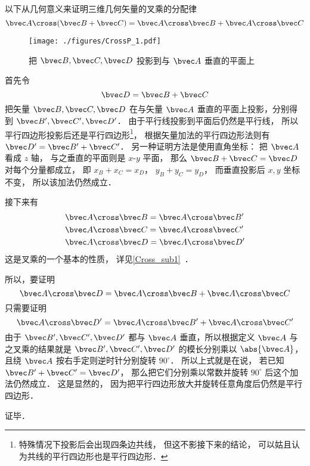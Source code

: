 
以下从几何意义来证明三维几何矢量的叉乘的分配律
\begin{equation}
\bvec A \cross (\bvec B + \bvec C) = \bvec A \cross \bvec B + \bvec A \cross \bvec C
\end{equation}

\begin{figure}[ht]
\vskip-10pt
\centering
\texttt{[image: ./figures/CrossP\_1.pdf]}
\caption{把 $\bvec B,\bvec C,\bvec D$ 投影到与 $\bvec A$ 垂直的平面上}
\end{figure}

首先令
\begin{equation}
\bvec D = \bvec B + \bvec C
\end{equation}
把矢量 $\bvec B,\bvec C,\bvec D$ 在与矢量 $\bvec A$ 垂直的平面上投影，分别得到 $\bvec B',\bvec C',\bvec D'$． 由于平行线投影到平面后仍然是平行线， 所以平行四边形投影后还是平行四边形\footnote{特殊情况下投影后会出现四条边共线， 但这不影接下来的结论， 可以姑且认为共线的平行四边形也是平行四边形．}， 根据矢量加法的平行四边形法则有 $\bvec D'=\bvec B'+\bvec C'$． 另一种证明方法是使用直角坐标： 把 $\bvec A$ 看成 $z$ 轴， 与之垂直的平面则是 $x$-$y$ 平面， 那么 $\bvec B + \bvec C = \bvec D$ 对每个分量都成立， 即 $x_B + x_C = x_D$， $y_B + y_C = y_D$， 而垂直投影后 $x,y$ 坐标不变， 所以该加法仍然成立．

接下来有
\begin{equation}
\begin{aligned}
&\bvec A \cross \bvec B = \bvec A \cross \bvec B'\\
&\bvec A \cross \bvec C = \bvec A \cross \bvec C'\\
&\bvec A \cross \bvec D = \bvec A \cross \bvec D'
\end{aligned}
\end{equation} 
这是叉乘的一个基本的性质， 详见\autoref{Cross_sub1}~．

所以，要证明
\begin{equation}
\bvec A \cross \bvec D = \bvec A \cross \bvec B + \bvec A \cross \bvec C
\end{equation}
只需要证明
\begin{equation}
\bvec A \cross \bvec D' = \bvec A \cross \bvec B' + \bvec A \cross \bvec C'
\end{equation}
由于 $\bvec B', \bvec C', \bvec D'$ 都与 $\bvec A$ 垂直，所以根据定义 $\bvec A$ 与之叉乘的结果就是 $\bvec B', \bvec C', \bvec D'$ 的模长分别乘以 $\abs {\bvec A}$， 且绕 $\bvec A$ 按右手定则逆时针分别旋转 $90^\circ$． 所以上式就是在说， 若已知 $\bvec B' + \bvec C' = \bvec D'$， 那么把它们分别乘以常数并旋转 $90^\circ$ 后这个加法仍然成立． 这是显然的， 因为把平行四边形放大并旋转任意角度后仍然是平行四边形．

证毕．
